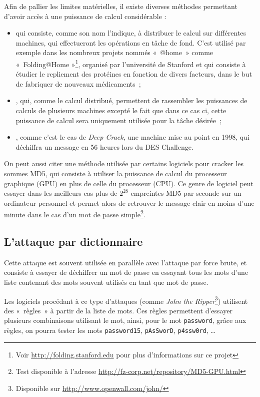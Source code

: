 Afin de pallier les limites matérielles, il existe diverses
méthodes permettant d'avoir accès à une puissance de
calcul considérable :
\begin{itemize}
  \item{} qui consiste, comme son nom
l'indique,
à distribuer le calcul sur différentes machines, qui effectueront
les opérations en tâche de fond. C'est utilisé par exemple dans
les nombreux projets nommés «~@home~» comme «~Folding@Home
»\footnote{Voir \url{http://folding.stanford.edu} pour plus
d'informations sur ce projet},
organisé par l'université de Stanford et qui consiste à étudier
le repliement des protéines en fonction de divers facteurs, dans
le but de fabriquer de nouveaux médicaments~;
  \item{}, qui, comme le
calcul distribué, permettent de rassembler les puissances de
calculs de plusieurs machines excepté le fait que dans ce cas ci, cette
puissance de calcul sera uniquement utilisée pour la tâche
désirée~;
  \item{}, comme c'est le cas de
\emph{Deep Crack}, une machine mise au point en 1998, qui déchiffra
un message en 56 heures lors du DES Challenge.\\
\end{itemize}

On peut aussi citer une méthode utilisée par certains logiciels pour
cracker les sommes MD5, qui consiste à utiliser la
puissance de calcul du processeur graphique (GPU) en plus de celle
du processeur (CPU). Ce genre de logiciel peut essayer dans les
meilleurs cas plus de
$2^{28}$ empreintes MD5 par seconde sur un ordinateur 
personnel et permet alors de retrouver le message clair en
moins d'une minute dans le cas d'un mot de passe simple\footnote{Test disponible à l'adresse
\url{http://fz-corp.net/repository/MD5-GPU.html}}.

\subsection{L'attaque par dictionnaire}
Cette attaque est souvent utilisée en parallèle avec l'attaque par
force brute, et consiste à essayer de déchiffrer un mot de passe
en essayant tous les mots d'une liste contenant des mots souvent
utilisés en tant que mot de passe.

Les logiciels procédant à ce type d'attaques (comme \emph{John the
Ripper}\footnote{Disponible sur
\url{http://www.openwall.com/john/}}) utilisent des «~règles~» à
partir de la liste de mots. Ces règles permettent d'essayer
plusieurs combinaisons utilisant le mot, ainsi, pour le mot
\texttt{password}, grâce aux règles, on pourra tester les mots
\texttt{password15}, \texttt{pAsSworD}, \texttt{p4ssw0rd}, \dots

